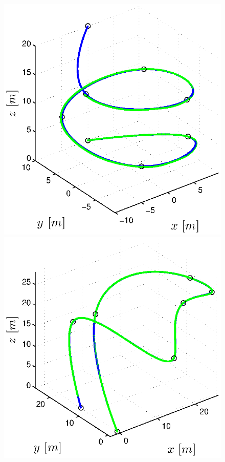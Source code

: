 \begin{figure}[H]
\begin{minipage}[t]{0.32\textwidth}
    \includegraphics[width = \textwidth]{trackings/figure_3D_helix_SplineDegree3_purePursuit_Disturbance_1}
  \end{minipage}
  \hfill
  \begin{minipage}[t]{0.32\textwidth}
    \includegraphics[width = \textwidth]{trackings/figure_3D_agile_SplineDegree3_purePursuit_Disturbance_1}

\end{minipage}
\end{figure}
